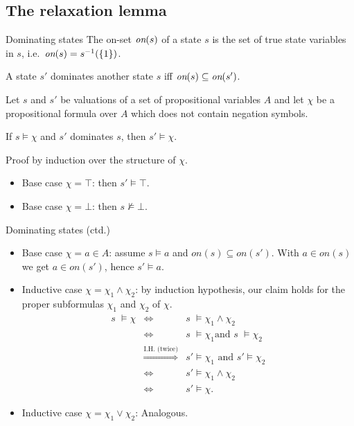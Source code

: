 \documentclass{gkibeamer}
\begin{document}
\subsection{The relaxation lemma}

\begin{frame}{Dominating states}
  The \alert{on-set} $\textit{on}(s)$ of a state $s$ is the set of
  true state variables in $s$, i.e.\ $\textit{on}(s) = s^{-1}(\{1\})$.
  
  A state $s'$ \alert{dominates} another state $s$ iff
  $\textit{on}(s) \subseteq \textit{on}(s')$.

  \begin{lemma}[domination]
    Let $s$ and $s'$ be valuations of a set of propositional variables
    $A$ and let $\chi$ be a propositional formula over $A$ which does not
    contain negation symbols.
    
    If $s \models \chi$ and $s'$ dominates $s$, then $s' \models \chi$.
  \end{lemma}

  \begin{proofstart}
    Proof by induction over the structure of $\chi$.
    \begin{itemize}
    \item Base case $\chi = \top$: then $s' \models \top$.
    \item Base case $\chi = \bot$: then $s \not\models \bot$.
    \end{itemize}
  \end{proofstart}
\end{frame}

\begin{frame}{Dominating states (ctd.)}
  \begin{proofend}
    \begin{itemize}
    \item Base case $\chi = a \in A$: assume $s \models a$ and
      $\mathit{on}(s) \subseteq \mathit{on}(s')$. With $a \in
      \mathit{on}(s)$ we get $a \in \mathit{on}(s')$, hence $s'
      \models a$.
    \item Inductive case $\chi = \chi_1 \wedge \chi_2$: by induction
      hypothesis, our claim holds for the proper subformulas $\chi_1$
      and $\chi_2$ of $\chi$.
      \begin{eqnarray*}
        s\phantom{'} \models \chi & \Longleftrightarrow & s\phantom{'} \models
        \chi_1 \wedge \chi_2\\ 
        & \Longleftrightarrow & s\phantom{'} \models \chi_1 \text{
          and } s\phantom{'} \models \chi_2\\ 
        & \stackrel{\textrm{I.H. (twice)}}{\Longrightarrow} &
        s' \models \chi_1 \text{ and } s' \models \chi_2\\
        & \Longleftrightarrow & s' \models \chi_1 \wedge \chi_2\\
        & \Longleftrightarrow & s' \models \chi.
      \end{eqnarray*}
    \item Inductive case $\chi = \chi_1 \vee \chi_2$: Analogous.
    \end{itemize}
  \end{proofend}
\end{frame}
\end{document}
